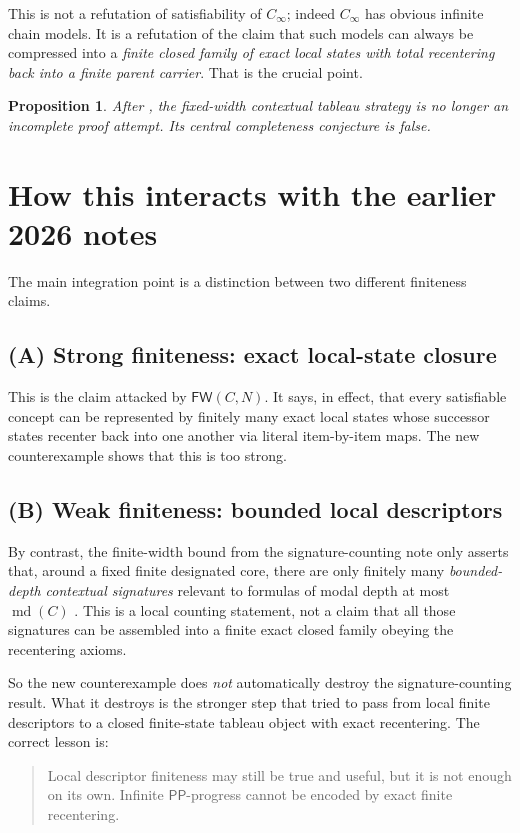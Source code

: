 \documentclass[11pt]{article}
\newtheorem{proposition}{Proposition}[section]
\newcommand{\Pp}{\mathsf{PP}}
\newcommand{\FW}{\mathsf{FW}}
\newcommand{\md}{\operatorname{md}}
\begin{document}
This is not a refutation of satisfiability of $C_\infty$; indeed $C_\infty$ has obvious infinite chain models. It is a refutation of the claim that such models can always be compressed into a \emph{finite closed family of exact local states with total recentering back into a finite parent carrier}. That is the crucial point.

\begin{proposition}
After \cite{Claude2026FW}, the fixed-width contextual tableau strategy is no longer an incomplete proof attempt. Its central completeness conjecture is false.
\end{proposition}

\section{How this interacts with the earlier 2026 notes}

The main integration point is a distinction between two different finiteness claims.

\subsection*{(A) Strong finiteness: exact local-state closure}
This is the claim attacked by $\FW(C,N)$. It says, in effect, that every satisfiable concept can be represented by finitely many exact local states whose successor states recenter back into one another via literal item-by-item maps. The new counterexample shows that this is too strong.

\subsection*{(B) Weak finiteness: bounded local descriptors}
By contrast, the finite-width bound from the signature-counting note only asserts that, around a fixed finite designated core, there are only finitely many \emph{bounded-depth contextual signatures} relevant to formulas of modal depth at most $\md(C)$ \cite{GPT2026Bound}. This is a local counting statement, not a claim that all those signatures can be assembled into a finite exact closed family obeying the recentering axioms.

So the new counterexample does \emph{not} automatically destroy the signature-counting result. What it destroys is the stronger step that tried to pass from local finite descriptors to a closed finite-state tableau object with exact recentering. The correct lesson is:
\begin{quote}
Local descriptor finiteness may still be true and useful, but it is not enough on its own. Infinite $\Pp$-progress cannot be encoded by exact finite recentering.
\end{quote}
\end{document}
